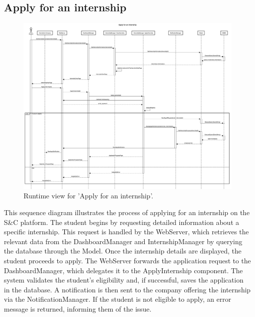 \subsection{Apply for an internship}
\begin{figure}[H]
    \begin{center}
        \includegraphics[width=0.8\linewidth]{DD/LaTeX/Images/RuntimeView/ApplyInternship.png}
        \caption{Runtime view for 'Apply for an internship'.}
        \label{fig:runtime_ApplyInternship}%
    \end{center}
\end{figure}

This sequence diagram illustrates the process of applying for an internship on the S\&C platform. The student begins by requesting detailed information about a specific internship. This request is handled by the WebServer, which retrieves the relevant data from the DashboardManager and InternshipManager by querying the database through the Model. Once the internship details are displayed, the student proceeds to apply. The WebServer forwards the application request to the DashboardManager, which delegates it to the ApplyInternship component. The system validates the student's eligibility and, if successful, saves the application in the database. A notification is then sent to the company offering the internship via the NotificationManager. If the student is not eligible to apply, an error message is returned, informing them of the issue.

